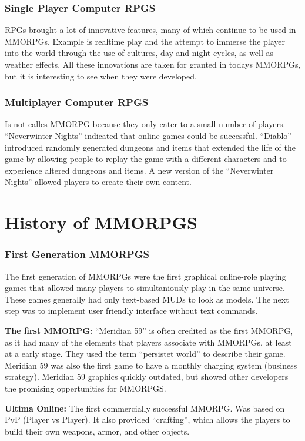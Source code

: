     \subsubsection*{Single Player Computer RPGS}
    RPGs brought a lot of innovative features, many of which continue to be used in MMORPGs. Example is realtime play and the attempt to immerse the player into the world through the use of cultures, day and night cycles, as well as weather effects. All these innovations are taken for granted in todays MMORPGs, but it is interesting to see when they were developed. 

    \subsubsection*{Multiplayer Computer RPGS}
    Is not calles MMORPG because they only cater to a small number of players. ``Neverwinter Nights'' indicated that online games could be successful. ``Diablo'' introduced randomly generated dungeons and items that extended the life of the game by allowing people to replay the game with a different characters and to experience altered dungeons and items. A new version of the ``Neverwinter Nights'' allowed players to create their own content. 

  \section*{History of MMORPGS}

    \subsubsection*{First Generation MMORPGS}
    The first generation of MMORPGs were the first graphical online-role playing games that allowed many players to simultaniously play in the same universe. These games generally had only text-based MUDs to look as models. The next step was to implement user friendly interface without text commands.

    {\bf The first MMORPG:} ``Meridian 59'' is often credited as the first MMORPG, as it had many of the elements that players associate with MMORPGs, at least at a early stage. They used the term ``persistet world'' to describe their game. Meridian 59 was also the first game to have a monthly charging system (business strategy). Meridian 59 graphics quickly outdated, but showed other developers the promising oppertunities for MMORPGS. 

    {\bf Ultima Online:} The first commercially successful MMORPG. Was based on PvP (Player vs Player). It also provided ``crafting'', which allows the players to build their own weapons, armor, and other objects. 

